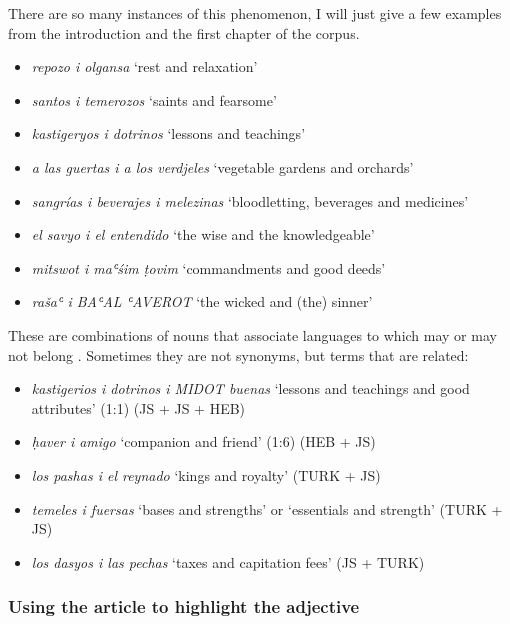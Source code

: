 \documentclass[output=paper,colorlinks,citecolor=brown,babel,arabicfont]{langscibook}
\begin{document}
There are so many instances of this phenomenon, I will just give a few examples from the introduction and the first chapter of the corpus.  

\begin{itemize}
\item \textit{repozo i olgansa} `rest and relaxation' 
\item \textit{santos i temerozos} `saints and fearsome'
\item \textit{kastigeryos i dotrinos} `lessons and teachings'
\item \textit{a las guertas i a los verdjeles} `vegetable gardens and orchards'
\item \textit{sangrías i beverajes i melezinas} `bloodletting, beverages and medicines'
\item \textit{el savyo i el entendido} `the wise and the knowledgeable'
\item \textit{mitswot i maʿśim ṭovim} `commandments and good deeds'
\item \textit{rašaʿ i BAʿAL ʿAVEROT} `the wicked and (the) sinner'
\end{itemize}

\label{ch3.7.ss.3.3.6.2.2}

These are combinations of nouns that associate languages to which  may or may not belong \citep[247]{bornes-varol2008}. Sometimes they are not synonyms, but terms that are related:

\begin{itemize}
\item \textit{kastigerios i dotrinos i MIDOT buenas} `lessons and teachings and good attributes' (1:1) (JS + JS + HEB)
\item \textit{ḥaver i amigo} `companion and friend' (1:6) (HEB + JS)
\item \textit{los pashas i el reynado} `kings and royalty' (TURK + JS)
\item \textit{temeles i fuersas} `bases and strengths' or `essentials and strength' (TURK + JS)
\item \textit{los dasyos i las pechas} `taxes and capitation fees' (JS + TURK)
\end{itemize}

\subsubsection{Using the article to highlight the adjective}\label{ch3.7.ss.3.3.7}
\end{document}
